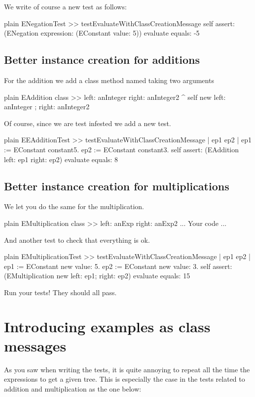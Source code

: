 \documentclass[10pt,twoside,english]{_support/latex/sbabook/sbabook}
\begin{document}
We write of course a new test as follows: 

\begin{displaycode}{plain}
ENegationTest >> testEvaluateWithClassCreationMessage
	self assert: (ENegation expression: (EConstant value: 5)) evaluate equals: -5
\end{displaycode}
\subsection{Better instance creation for  additions}
For the addition we  add a class method named  taking two arguments 

\begin{displaycode}{plain}
EAddition class >> left: anInteger right: anInteger2
	^ self new left: anInteger ; right: anInteger2 
\end{displaycode}

Of course, since we are test infested we add a new test. 

\begin{displaycode}{plain}
EEAdditionTest >> testEvaluateWithClassCreationMessage
	| ep1 ep2 |
	ep1 := EConstant constant5.
	ep2 := EConstant constant3.
	self assert: (EAddition left: ep1 right: ep2) evaluate equals: 8
\end{displaycode}
\subsection{Better instance creation for  multiplications}
We let you do the same for the multiplication. 

\begin{displaycode}{plain}
EMultiplication class >> left: anExp right: anExp2
	... Your code ...
\end{displaycode}

And another test to check that everything is ok. 

\begin{displaycode}{plain}
EMultiplicationTest >> testEvaluateWithClassCreationMessage
	| ep1 ep2 |
	ep1 := EConstant new value: 5.
	ep2 := EConstant new value: 3.
	self assert: (EMultiplication new left: ep1; right: ep2) evaluate equals: 15
\end{displaycode}

Run your tests! They should all pass. 
\section{Introducing examples as class messages}
As you saw when writing the tests, it is quite annoying to repeat all the time the expressions to get a given tree. This is especially the case in the tests related to addition and multiplication as the one below: 
\end{document}
